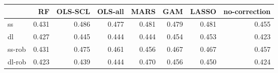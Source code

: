 \begin{tabular}{lrrrrrrr}
\toprule
 & RF & OLS-SCL & OLS-all & MARS & GAM & LASSO & no-correction \\
\midrule
ss & {\cellcolor[HTML]{F1F1F1}} \color[HTML]{000000} 0.431 & {\cellcolor[HTML]{000000}} \color[HTML]{F1F1F1} 0.486 & {\cellcolor[HTML]{272727}} \color[HTML]{F1F1F1} 0.477 & {\cellcolor[HTML]{141414}} \color[HTML]{F1F1F1} 0.481 & {\cellcolor[HTML]{1C1C1C}} \color[HTML]{F1F1F1} 0.479 & {\cellcolor[HTML]{141414}} \color[HTML]{F1F1F1} 0.481 & {\cellcolor[HTML]{878787}} \color[HTML]{F1F1F1} 0.455 \\
dl & {\cellcolor[HTML]{CFCFCF}} \color[HTML]{000000} 0.427 & {\cellcolor[HTML]{444444}} \color[HTML]{F1F1F1} 0.445 & {\cellcolor[HTML]{4A4A4A}} \color[HTML]{F1F1F1} 0.444 & {\cellcolor[HTML]{4A4A4A}} \color[HTML]{F1F1F1} 0.444 & {\cellcolor[HTML]{000000}} \color[HTML]{F1F1F1} 0.454 & {\cellcolor[HTML]{040404}} \color[HTML]{F1F1F1} 0.453 & {\cellcolor[HTML]{F1F1F1}} \color[HTML]{000000} 0.423 \\
ss-rob & {\cellcolor[HTML]{F1F1F1}} \color[HTML]{000000} 0.431 & {\cellcolor[HTML]{000000}} \color[HTML]{F1F1F1} 0.475 & {\cellcolor[HTML]{4E4E4E}} \color[HTML]{F1F1F1} 0.461 & {\cellcolor[HTML]{6A6A6A}} \color[HTML]{F1F1F1} 0.456 & {\cellcolor[HTML]{2D2D2D}} \color[HTML]{F1F1F1} 0.467 & {\cellcolor[HTML]{2B2B2B}} \color[HTML]{F1F1F1} 0.467 & {\cellcolor[HTML]{616161}} \color[HTML]{F1F1F1} 0.457 \\
dl-rob & {\cellcolor[HTML]{F1F1F1}} \color[HTML]{000000} 0.423 & {\cellcolor[HTML]{A2A2A2}} \color[HTML]{F1F1F1} 0.439 & {\cellcolor[HTML]{888888}} \color[HTML]{F1F1F1} 0.444 & {\cellcolor[HTML]{000000}} \color[HTML]{F1F1F1} 0.470 & {\cellcolor[HTML]{494949}} \color[HTML]{F1F1F1} 0.456 & {\cellcolor[HTML]{696969}} \color[HTML]{F1F1F1} 0.450 & {\cellcolor[HTML]{EBEBEB}} \color[HTML]{000000} 0.424 \\
\bottomrule
\end{tabular}
